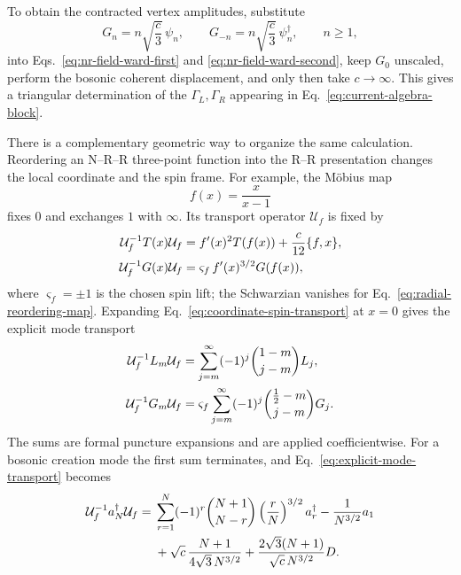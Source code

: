 \documentclass[11pt]{article}
\begin{document}
To obtain the contracted vertex amplitudes, substitute
\begin{equation}
 G_n=n\sqrt{\frac c3}\,\psi_n,\qquad
 G_{-n}=n\sqrt{\frac c3}\,\psi_n^\dagger,
 \qquad n\geq1,
 \label{eq:ward-to-contracted-modes}
\end{equation}
into Eqs.~\eqref{eq:nr-field-ward-first} and
\eqref{eq:nr-field-ward-second}, keep \(G_0\) unscaled, perform the
bosonic coherent displacement, and only then take \(c\to\infty\).
This gives a triangular determination of the \(\Gamma_L,\Gamma_R\)
appearing in Eq.~\eqref{eq:current-algebra-block}.

There is a complementary geometric way to organize the same
calculation.  Reordering an N--R--R three-point function into the R--R
presentation changes the local coordinate and the spin frame.  For
example, the Möbius map
\begin{equation}
 f(x)=\frac{x}{x-1}
 \label{eq:radial-reordering-map}
\end{equation}
fixes \(0\) and exchanges \(1\) with \(\infty\).  Its transport operator
\(\mathcal U_f\) is fixed by
\begin{align}
 \mathcal U_f^{-1}T(x)\mathcal U_f
 &=f'(x)^2T(f(x))+\frac c{12}\{f,x\},
 \notag\\
 \mathcal U_f^{-1}G(x)\mathcal U_f
 &=\varsigma_f\,f'(x)^{3/2}G(f(x)),
 \label{eq:coordinate-spin-transport}
\end{align}
where \(\varsigma_f=\pm1\) is the chosen spin lift; the Schwarzian
vanishes for Eq.~\eqref{eq:radial-reordering-map}.  Expanding
Eq.~\eqref{eq:coordinate-spin-transport} at \(x=0\) gives the explicit
mode transport
\begin{align}
 \mathcal U_f^{-1}L_m\mathcal U_f
 &=
 \sum_{j=m}^{\infty}(-1)^j
 \binom{1-m}{j-m}L_j,
 \notag\\
 \mathcal U_f^{-1}G_m\mathcal U_f
 &=
 \varsigma_f\sum_{j=m}^{\infty}(-1)^j
 \binom{\frac12-m}{j-m}G_j.
 \label{eq:explicit-mode-transport}
\end{align}
The sums are formal puncture expansions and are applied
coefficientwise.  For a bosonic creation mode the first sum terminates,
and Eq.~\eqref{eq:explicit-mode-transport} becomes
\begin{align}
 \mathcal U_f^{-1}a_N^\dagger\mathcal U_f
 ={}&
 \sum_{r=1}^{N}(-1)^r\binom{N+1}{N-r}
 \left(\frac rN\right)^{3/2}a_r^\dagger
 -\frac{1}{N^{3/2}}a_1
 \notag\\
 &+
 \sqrt c\,\frac{N+1}{4\sqrt3\,N^{3/2}}
 +
 \frac{2\sqrt3(N+1)}{\sqrt c\,N^{3/2}}D.
 \label{eq:explicit-bosonic-transport}
\end{align}
\end{document}
